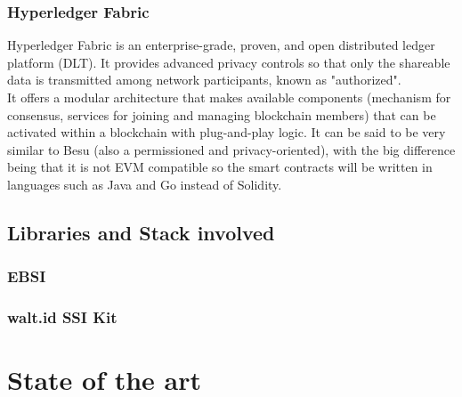 \subsubsection{Hyperledger Fabric}
Hyperledger Fabric is an enterprise-grade, proven, and open distributed ledger 
platform (DLT). It provides advanced privacy controls so that only the shareable 
data is transmitted among network participants, known as "authorized".\\
It offers a modular architecture that makes available components (mechanism for 
consensus, services for joining and managing blockchain members) that can be activated
within a blockchain with plug-and-play logic. It can be said to be very similar to 
Besu (also a permissioned and privacy-oriented), with the big difference being that 
it is not EVM compatible so the smart contracts will be written in languages such as 
Java and Go instead of Solidity.
\subsection{Libraries and Stack involved}
\subsubsection{EBSI}
\subsubsection{walt.id SSI Kit}

\section{State of the art}
